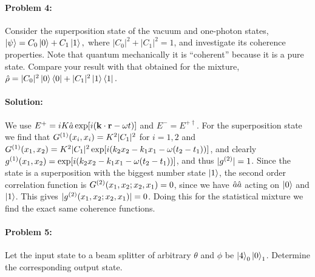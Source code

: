 \paragraph{Problem 4:} Consider the superposition state of the vacuum and one-photon states,$\ket{\psi} = C_0\ket{0} + C_1\ket{1},$ where $|C_0|^2 + |C_1|^2 = 1$, and investigate its coherence properties. Note that quantum mechanically it is “coherent” because it is a pure state. Compare your result with that obtained for the mixture, $\hat{\rho} = |C_0|^2 \ket{0}\bra{0} + |C_1|^2 \ket{1}\bra{1}.$

\paragraph{Solution:} We use $E^+ = iK\hat{a} \exp[i(\bm{\mathrm{k}}\cdot\bm{\mathrm{r}} - \omega t)]$ and $E^- = E^{+\dagger}$. For the superposition state we find that $G^{(1)}(x_i,x_i) = K^2 |C_1|^2$ for $i=1,2$ and $G^{(1)}(x_1, x_2) = K^2 |C_1|^2 \exp[i(k_2 x_2 - k_1x_1 - \omega(t_2 - t_1))]$, and clearly $g^{(1)}(x_1,x_2) = \exp[i(k_2 x_2 - k_1x_1 - \omega(t_2 - t_1))]$, and thus $|g^{(2)}|=1$. Since the state is a superposition with the biggest number state $\ket{1}$, the second order correlation function is $G^{(2)}(x_1, x_2; x_2, x_1) = 0$, since we have $\hat{a}\hat{a}$ acting on $\ket{0}$ and $\ket{1}$. This gives $|g^{(2)}(x_1, x_2; x_2, x_1)| = 0$. Doing this for the statistical mixture we find the exact same coherence functions.

\paragraph{Problem  5:} Let the input state to a beam splitter of arbitrary $\theta$ and $\phi$ be $\ket{4}_0\ket{0}_1$. Determine the corresponding output state.

\newcommand{\cost}{\cos(\theta)}
\newcommand{\costt}{\cos(\theta/2)}
\newcommand{\sintt}{\sin(\theta/2)}
\newcommand{\expi}{\exp(i\phi)}
\newcommand{\expim}{\exp(-i\phi)}
\newcommand{\kettt}[2]{\ket{#1}_2\ket{#2}_3}

